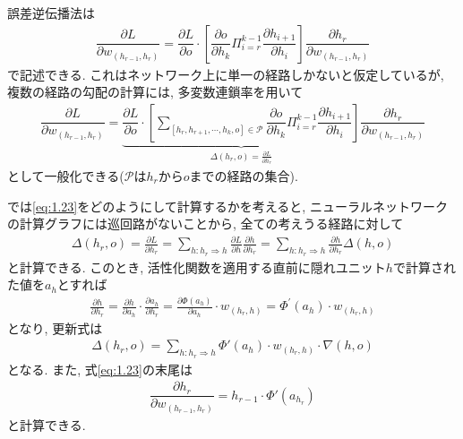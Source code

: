 \documentclass[dvipdfmx,report,11pt]{jsbook}
\begin{document}
誤差逆伝播法は
\begin{align}
  \dfrac{\partial L}{\partial w_{(h_{r-1},h_r)}}=\dfrac{\partial L}{\partial o}\cdot\left[\dfrac{\partial o}{\partial h_k}\Pi_{i=r}^{k-1}\dfrac{\partial h_{i+1}}{\partial h_i}\right]\dfrac{\partial h_r}{\partial w_{(h_{r-1},h_r)}}
\end{align}
で記述できる. これはネットワーク上に単一の経路しかないと仮定しているが, 複数の経路の勾配の計算には, 多変数連鎖率を用いて
\begin{align}
  \dfrac{\partial L}{\partial w_{(h_{r-1},h_r)}}=\underbrace{\dfrac{\partial L}{\partial o}\cdot\left[\sum_{[h_r, h_{r+1}, \cdots, h_k,o]\in \mathcal{P}}\dfrac{\partial o}{\partial h_k}\Pi_{i=r}^{k-1}\dfrac{\partial h_{i+1}}{\partial h_i}\right]}_{\Delta(h_r,o)=\frac{\partial L}{\partial h_r}}\dfrac{\partial h_r}{\partial w_{(h_{r-1},h_r)}}\label{eq:1.23}
\end{align}
として一般化できる($\mathcal{P}$は$h_r$から$o$までの経路の集合). 

では\eqref{eq:1.23}をどのようにして計算するかを考えると, ニューラルネットワークの計算グラフには巡回路がないことから, 全ての考えうる経路に対して
\setcounter{equation}{24}
\begin{align}
  \Delta\left(h_r, o\right)=\frac{\partial L}{\partial h_r}=\sum_{h: h_r \Rightarrow h} \frac{\partial L}{\partial h} \frac{\partial h}{\partial h_r}=\sum_{h: h_r \Rightarrow h} \frac{\partial h}{\partial h_r} \Delta(h, o)
\end{align}
と計算できる. このとき, 活性化関数を適用する直前に隠れユニット$h$で計算された値を$a_h$とすれば
\begin{align}
  \frac{\partial h}{\partial h_r}=\frac{\partial h}{\partial a_h} \cdot \frac{\partial a_h}{\partial h_r}=\frac{\partial \Phi\left(a_h\right)}{\partial a_h} \cdot w_{\left(h_r, h\right)}=\Phi^{\prime}\left(a_h\right) \cdot w_{\left(h_r, h\right)}
\end{align}
となり, 更新式は
\begin{align}
  \Delta(h_r, o)=\sum_{h:h_r\Rightarrow h}\Phi'(a_h)\cdot w_{(h_r,h)}\cdot\nabla(h,o)
\end{align}
となる. また, 式\eqref{eq:1.23}の末尾は
\begin{align}
  \dfrac{\partial h_r}{\partial w_{(h_{r-1}, h_r)}}=h_{r-1}\cdot\Phi'(a_{h_r})
\end{align}
と計算できる.



% 
% 
\end{document}
